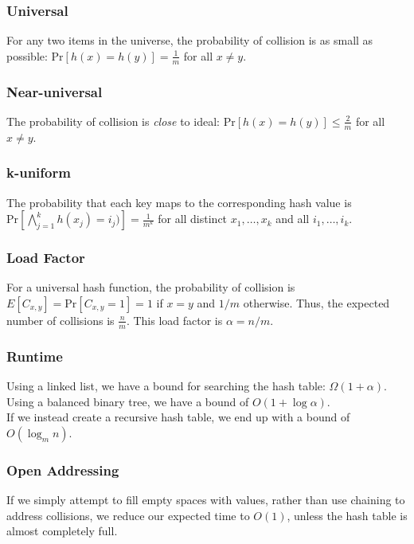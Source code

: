 \subsubsection{Universal}
For any two items in the universe, the probability of collision is as small as possible: $\text{Pr}[h(x) = h(y)] = \frac{1}{m}$ for all $x \neq y$.

\subsubsection{Near-universal}
The probability of collision is \emph{close} to ideal: $\text{Pr}[h(x) = h(y)] \leq \frac{2}{m}$ for all $x \neq y$.

\subsubsection{k-uniform}
The probability that each key maps to the corresponding hash value is $\text{Pr}[\bigwedge_{j=1}^{k} h(x_j) = i_j)] = \frac{1}{m^{k}}$ for all distinct $x_1,\ldots,x_k$ and all $i_1,\ldots,i_k$.

\subsubsection{Load Factor}
For a universal hash function, the probability of collision is $E[C_{x, y}] = \text{Pr}[C_{x,y} = 1] = 1$ if $x = y$ and $1/m$ otherwise. Thus, the expected number of collisions is $\frac{n}{m}$. This load factor is $\alpha = n/m$.\\

\subsubsection{Runtime}
Using a linked list, we have a bound for searching the hash table: $\Omega(1 + \alpha)$. Using a balanced binary tree, we have a bound of $O(1 + \log \alpha)$.\\

If we instead create a recursive hash table, we end up with a bound of $O(\log_m n)$.

\subsubsection{Open Addressing}
If we simply attempt to fill empty spaces with values, rather than use chaining to address collisions, we reduce our expected time to $O(1)$, unless the hash table is almost completely full.